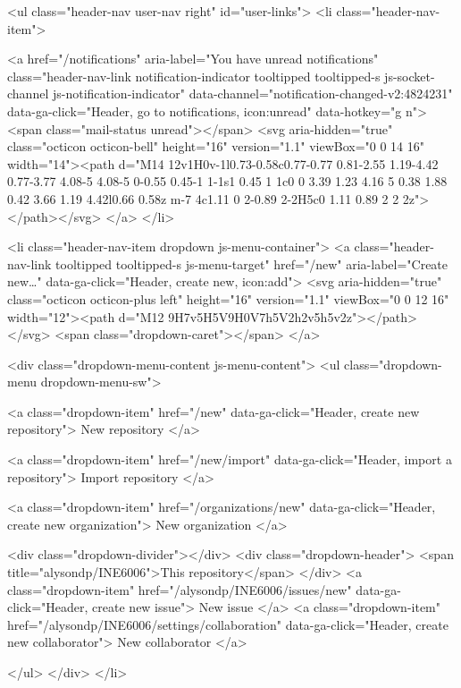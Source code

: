     
<ul class="header-nav user-nav right" id="user-links">
  <li class="header-nav-item">
    
    <a href="/notifications" aria-label="You have unread notifications" class="header-nav-link notification-indicator tooltipped tooltipped-s js-socket-channel js-notification-indicator" data-channel="notification-changed-v2:4824231" data-ga-click="Header, go to notifications, icon:unread" data-hotkey="g n">
        <span class="mail-status unread"></span>
        <svg aria-hidden="true" class="octicon octicon-bell" height="16" version="1.1" viewBox="0 0 14 16" width="14"><path d="M14 12v1H0v-1l0.73-0.58c0.77-0.77 0.81-2.55 1.19-4.42 0.77-3.77 4.08-5 4.08-5 0-0.55 0.45-1 1-1s1 0.45 1 1c0 0 3.39 1.23 4.16 5 0.38 1.88 0.42 3.66 1.19 4.42l0.66 0.58z m-7 4c1.11 0 2-0.89 2-2H5c0 1.11 0.89 2 2 2z"></path></svg>
</a>
  </li>

  <li class="header-nav-item dropdown js-menu-container">
    <a class="header-nav-link tooltipped tooltipped-s js-menu-target" href="/new"
       aria-label="Create new…"
       data-ga-click="Header, create new, icon:add">
      <svg aria-hidden="true" class="octicon octicon-plus left" height="16" version="1.1" viewBox="0 0 12 16" width="12"><path d="M12 9H7v5H5V9H0V7h5V2h2v5h5v2z"></path></svg>
      <span class="dropdown-caret"></span>
    </a>

    <div class="dropdown-menu-content js-menu-content">
      <ul class="dropdown-menu dropdown-menu-sw">
        
<a class="dropdown-item" href="/new" data-ga-click="Header, create new repository">
  New repository
</a>

  <a class="dropdown-item" href="/new/import" data-ga-click="Header, import a repository">
    Import repository
  </a>


  <a class="dropdown-item" href="/organizations/new" data-ga-click="Header, create new organization">
    New organization
  </a>



  <div class="dropdown-divider"></div>
  <div class="dropdown-header">
    <span title="alysondp/INE6006">This repository</span>
  </div>
    <a class="dropdown-item" href="/alysondp/INE6006/issues/new" data-ga-click="Header, create new issue">
      New issue
    </a>
    <a class="dropdown-item" href="/alysondp/INE6006/settings/collaboration" data-ga-click="Header, create new collaborator">
      New collaborator
    </a>

      </ul>
    </div>
  </li>

